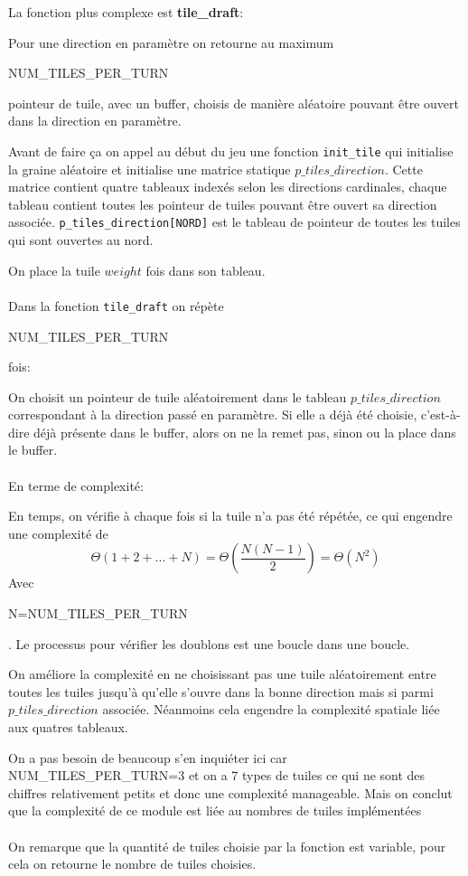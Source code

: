 \hspace{0.1em}

La fonction plus complexe est \textbf{tile\_draft}: 

Pour une direction en paramètre on retourne au maximum \begin{scriptsize}NUM\_TILES\_PER\_TURN\end{scriptsize} pointeur de tuile, avec un buffer, choisis de manière aléatoire pouvant être ouvert dans la direction en paramètre.

Avant de faire ça on appel au début du jeu une fonction \texttt{init\_tile} qui initialise la graine aléatoire et initialise une matrice statique $p\_tiles\_direction$. Cette matrice contient quatre tableaux indexés selon les directions cardinales, chaque tableau contient toutes les pointeur de tuiles pouvant être ouvert sa direction associée. \texttt{p\_tiles\_direction[NORD]} est le tableau de pointeur de toutes les tuiles qui sont ouvertes au nord.

On place la tuile $weight$ fois dans son tableau.\\
\\
Dans la fonction \texttt{tile\_draft} on répète \begin{scriptsize}NUM\_TILES\_PER\_TURN\end{scriptsize} fois:

On choisit un pointeur de tuile aléatoirement dans le tableau $p\_tiles\_direction$ correspondant à la direction passé en paramètre. Si elle a déjà été choisie, c'est-à-dire déjà présente dans le buffer, alors on ne la remet pas, sinon ou la place dans le buffer. \\
\\
En terme de complexité:

En temps, on vérifie à chaque fois si la tuile n'a pas été répétée, ce qui engendre une complexité de 
\begin{equation}
  \Theta(1+2+...+N) = \Theta(\frac{N(N-1)}{2}) = \Theta(N^{2}) 
\end{equation}
Avec \begin{scriptsize}N=NUM\_TILES\_PER\_TURN\end{scriptsize}. Le processus pour vérifier les doublons est une boucle dans une boucle.

On améliore la complexité en ne choisissant pas une tuile aléatoirement entre toutes les tuiles jusqu'à qu'elle s'ouvre dans la bonne direction mais si parmi $p\_tiles\_direction$ associée. Néanmoins cela engendre la complexité spatiale liée aux quatres tableaux.

On a pas besoin de beaucoup s'en inquiéter ici car NUM\_TILES\_PER\_TURN=3 et on a 7 types de tuiles ce qui ne sont des chiffres relativement petits et donc une complexité manageable. Mais on conclut que la complexité de ce module est liée au nombres de tuiles implémentées\\
\\
On remarque que la quantité de tuiles choisie par la fonction est variable, pour cela on retourne le nombre de tuiles choisies.
